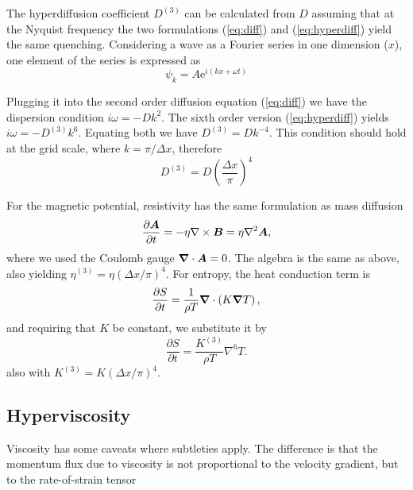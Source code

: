 \documentclass[\mydriver,12pt,twoside,notitlepage,a4paper]{article}
\renewcommand{\vec}[1]{\mbox{\boldmath{$#1$}}}
\newcommand{\grad}    {\vec{\nabla}}
\newcommand{\Div}     {\vec{\nabla}\cdot}
\newcommand{\curl}    {\nabla\times}
\newcommand{\Laplace} {\nabla^2}
\newcommand{\pderiv}[2]{\frac{\partial #1}{\partial #2}}
\newcommand{\Av}            {\vec{A}}
\newcommand{\Bv}            {\vec{B}}
\begin{document}
The hyperdiffusion coefficient $D^{(3)}$ can be calculated
from $D$ assuming that at the Nyquist frequency the two
formulations (\ref{eq:diff}) and (\ref{eq:hyperdiff}) yield the same
quenching.
Considering a wave as a Fourier series in one dimension ($x$),
one element of the series is expressed as
\begin{equation}
  \psi_k = A {\mathrm e}^{i(k x +  \omega t)}
\end{equation}

Plugging it into the second order diffusion equation (\ref{eq:diff})
we have the dispersion condition $i\omega = -D k^2$.
The sixth order version (\ref{eq:hyperdiff}) yields $i\omega = -D^{(3)}
k^6$.
Equating both we have  $D^{(3)} = D k^{-4}$.
This condition should hold at the grid scale, where $k=\pi/\Delta x$,
therefore
\begin{equation}
  \label{eq:diffrho-hyper}
  D^{(3)} = D \left(\frac{{\Delta}x}{\pi}\right)^4
\end{equation}


For the magnetic potential, resistivity has the same formulation as mass
diffusion
\begin{equation}
  \pderiv{\Av}{t} = -\eta\curl{\Bv} = \eta\Laplace{\Av} ,
\end{equation}
where we used the Coulomb gauge $\Div{\Av}=0$.
The algebra is the same as above, also yielding
$\eta^{(3)}=\eta({\Delta}x/\pi)^4$.
For entropy, the heat conduction term is
\begin{equation}
  \pderiv{S}{t}=\frac{1}{\rho T}\Div\left(K\grad{T}\right),
\end{equation}
and requiring that $K$ be constant, we substitute it by
\begin{equation}
  \pderiv{S}{t}=\frac{K^{(3)}}{\rho T}\nabla^6T.
\end{equation}
also with $K^{(3)}=K({\Delta}x/\pi)^4$.


\subsection{Hyperviscosity}

Viscosity has some caveats where subtleties apply. The difference is that the momentum flux due to viscosity is not proportional to the velocity gradient, but to the rate-of-strain tensor
\end{document}
